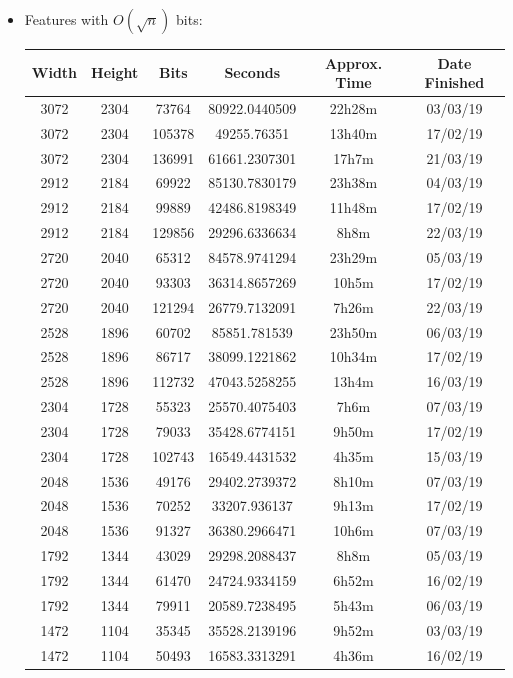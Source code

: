 \documentclass[11pt,a4paper]{report}
\begin{document}
\begin{itemize}
\newpage
\item Features with $O(\sqrt{n})$ bits:
  \begin{center}
  \begin{tabular}{ c c c | c c c }
  Width & Height & Bits & Seconds & Approx. Time & Date Finished \\ \hline
  3072 & 2304 & 73764 & 80922.0440509 & 22h28m & 03/03/19 \\
  3072 & 2304 & 105378 & 49255.76351 & 13h40m & 17/02/19 \\
  3072 & 2304 & 136991 & 61661.2307301 & 17h7m & 21/03/19 \\
  2912 & 2184 & 69922 & 85130.7830179 & 23h38m & 04/03/19 \\
  2912 & 2184 & 99889 & 42486.8198349 & 11h48m & 17/02/19 \\
  2912 & 2184 & 129856 & 29296.6336634 & 8h8m & 22/03/19 \\
  2720 & 2040 & 65312 & 84578.9741294 & 23h29m & 05/03/19 \\
  2720 & 2040 & 93303 & 36314.8657269 & 10h5m & 17/02/19 \\
  2720 & 2040 & 121294 & 26779.7132091 & 7h26m & 22/03/19 \\
  2528 & 1896 & 60702 & 85851.781539 & 23h50m & 06/03/19 \\
  2528 & 1896 & 86717 & 38099.1221862 & 10h34m & 17/02/19 \\
  2528 & 1896 & 112732 & 47043.5258255 & 13h4m & 16/03/19 \\
  2304 & 1728 & 55323 & 25570.4075403 & 7h6m & 07/03/19 \\
  2304 & 1728 & 79033 & 35428.6774151 & 9h50m & 17/02/19 \\
  2304 & 1728 & 102743 & 16549.4431532 & 4h35m & 15/03/19 \\
  2048 & 1536 & 49176 & 29402.2739372 & 8h10m & 07/03/19 \\
  2048 & 1536 & 70252 & 33207.936137 & 9h13m & 17/02/19 \\
  2048 & 1536 & 91327 & 36380.2966471 & 10h6m & 07/03/19 \\
  1792 & 1344 & 43029 & 29298.2088437 & 8h8m & 05/03/19 \\
  1792 & 1344 & 61470 & 24724.9334159 & 6h52m & 16/02/19 \\
  1792 & 1344 & 79911 & 20589.7238495 & 5h43m & 06/03/19 \\
  1472 & 1104 & 35345 & 35528.2139196 & 9h52m & 03/03/19 \\
  1472 & 1104 & 50493 & 16583.3313291 & 4h36m & 16/02/19 \\

\end{tabular}
\end{center}
\end{itemize}
\end{document}
